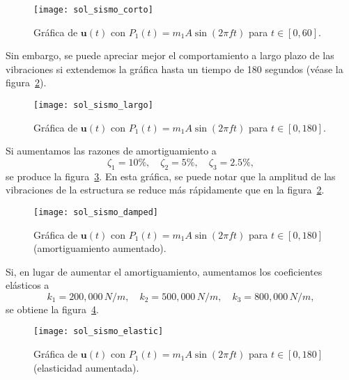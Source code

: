 \begin{figure}[ht!]
    \centering
    \texttt{[image: sol\_sismo\_corto]}
    \caption{Gráfica de \(\mathbf{u}(t)\) con \(P_1(t) = m_1 A \sin(2\pi f t)\) para \(t \in [0, 60]\).}
    \label{fig:sol-sismo-corto}
\end{figure}

Sin embargo, se puede apreciar mejor el comportamiento a largo plazo de las vibraciones si extendemos la gráfica hasta un tiempo de 180 segundos (véase la figura~\ref{fig:sol-sismo-largo}).

\begin{figure}[ht!]
    \centering
    \texttt{[image: sol\_sismo\_largo]}
    \caption{Gráfica de \(\mathbf{u}(t)\) con \(P_1(t) = m_1 A \sin(2\pi f t)\) para \(t \in [0, 180]\).}
    \label{fig:sol-sismo-largo}
\end{figure}

Si aumentamos las razones de amortiguamiento a
\[
    \zeta_1 = 10\%, \quad \zeta_2 = 5\%, \quad \zeta_3 = 2.5\%
,\]
se produce la figura~\ref{fig:sol-sismo-damped}. En esta gráfica, se puede notar que la amplitud de las vibraciones de la estructura se reduce más rápidamente que en la figura~\ref{fig:sol-sismo-largo}.

\begin{figure}[ht!]
    \centering
    \texttt{[image: sol\_sismo\_damped]}
    \caption{Gráfica de \(\mathbf{u}(t)\) con \(P_1(t) = m_1 A \sin(2\pi f t)\) para \(t \in [0, 180]\) (amortiguamiento aumentado).}
    \label{fig:sol-sismo-damped}
\end{figure}

Si, en lugar de aumentar el amortiguamiento, aumentamos los coeficientes elásticos a
\[
    k_1 = 200,000 \, \si{N/m}, \quad k_2 = 500,000 \, \si{N/m}, \quad k_3 = 800,000 \, \si{N/m}
,\]
se obtiene la figura~\ref{fig:sol-sismo-elastic}.

\begin{figure}[ht!]
    \centering
    \texttt{[image: sol\_sismo\_elastic]}
    \caption{Gráfica de \(\mathbf{u}(t)\) con \(P_1(t) = m_1 A \sin(2\pi f t)\) para \(t \in [0, 180]\) (elasticidad aumentada).}
    \label{fig:sol-sismo-elastic}
\end{figure}
